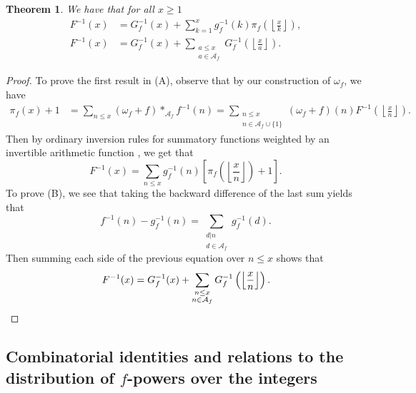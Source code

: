 \documentclass[11pt,reqno,a4letter]{article}
\numberwithin{figure}{section}
\numberwithin{table}{section}
\newcommand{\cf}{\textit{cf.\ }}
\newcommand{\Floor}[2]{\ensuremath{\left\lfloor \frac{#1}{#2} \right\rfloor}}
\theoremstyle{plain}
\newtheorem{theorem}{Theorem}
\numberwithin{theorem}{section}
\theoremstyle{definition}
\begin{document}
\begin{theorem}
We have that for all $x \geq 1$ 
\begin{align} 
\tag{A}
F^{-1}(x) & = G_f^{-1}(x) + \sum_{k=1}^{x} g_f^{-1}(k) \pi_f\left(\Floor{x}{k}\right), \\ 
\tag{B}
F^{-1}(x) & = G_f^{-1}(x) + \sum_{\substack{a \leq x \\ a \in \mathcal{A}_f}} 
     G_f^{-1}\left(\Floor{x}{a}\right). 
\end{align}
\end{theorem}
\begin{proof}
To prove the first result in (A), observe that by our construction of $\omega_f$, we have 
\begin{align*}
\pi_f(x) + 1 & = \sum_{n \leq x} (\omega_f + f) \ast_{\mathcal{A}_f} f^{-1}(n)
     = \sum_{\substack{n \leq x \\ n \in \mathcal{A}_f \cup \{1\}}}
     (\omega_f+f)(n) F^{-1}\left(\Floor{x}{n}\right). 
\end{align*}
Then by ordinary inversion rules for summatory functions weighted by an invertible 
arithmetic function \cite[\cf \S TODO]{APOSTOLANUMT}, we get that 
\[
F^{-1}(x) = \sum_{n \leq x} g_f^{-1}(n) \left[\pi_f\left(\Floor{x}{n}\right) + 1\right]. 
\]
To prove (B), we see that taking the backward difference of the last sum yields that 
\[
f^{-1}(n) - g_f^{-1}(n) = \sum_{\substack{d|n \\ d \in \mathcal{A}_f}} g_f^{-1}(d). 
\]
Then summing each side of the previous equation over $n \leq x$ shows that 
\[
F^{-1}(x) = G_f^{-1}(x) + \sum_{\substack{n \leq x \\ n \in \mathcal{A}_f}} G_f^{-1}\left( 
     \Floor{x}{n}\right). 
     \qedhere
\]
\end{proof}


\subsection{Combinatorial identities and relations to the distribution of $f$-powers over the integers} 
\end{document}
